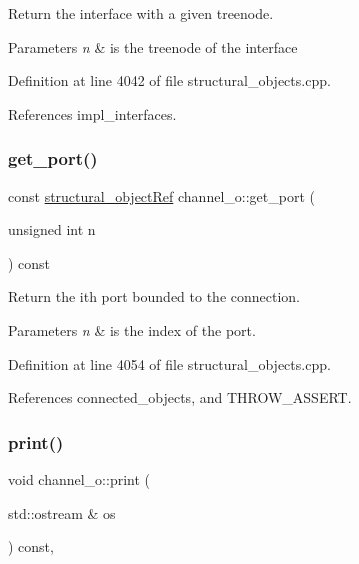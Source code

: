 Return the interface with a given treenode. 


\begin{DoxyParams}{Parameters}
{\em n} & is the treenode of the interface \\
\hline
\end{DoxyParams}


Definition at line 4042 of file structural\+\_\+objects.\+cpp.



References impl\+\_\+interfaces.

\mbox{\label{classchannel__o_a8fe4c25a438c793c2ffb7e34c71df757}} 
\subsubsection{\texorpdfstring{get\+\_\+port()}{get\_port()}}
{\footnotesize\ttfamily const \hyperlink{structural__objects_8hpp_a8ea5f8cc50ab8f4c31e2751074ff60b2}{structural\+\_\+object\+Ref} channel\+\_\+o\+::get\+\_\+port (\begin{DoxyParamCaption}\item[{unsigned int}]{n }\end{DoxyParamCaption}) const}



Return the ith port bounded to the connection. 


\begin{DoxyParams}{Parameters}
{\em n} & is the index of the port. \\
\hline
\end{DoxyParams}


Definition at line 4054 of file structural\+\_\+objects.\+cpp.



References connected\+\_\+objects, and T\+H\+R\+O\+W\+\_\+\+A\+S\+S\+E\+RT.

\mbox{\label{classchannel__o_ad3730f48e78b2404ab9acacf200cef73}} 
\subsubsection{\texorpdfstring{print()}{print()}}
{\footnotesize\ttfamily void channel\+\_\+o\+::print (\begin{DoxyParamCaption}\item[{std\+::ostream \&}]{os }\end{DoxyParamCaption}) const\hspace{0.3cm}{\ttfamily [override]}, {\ttfamily [virtual]}}




